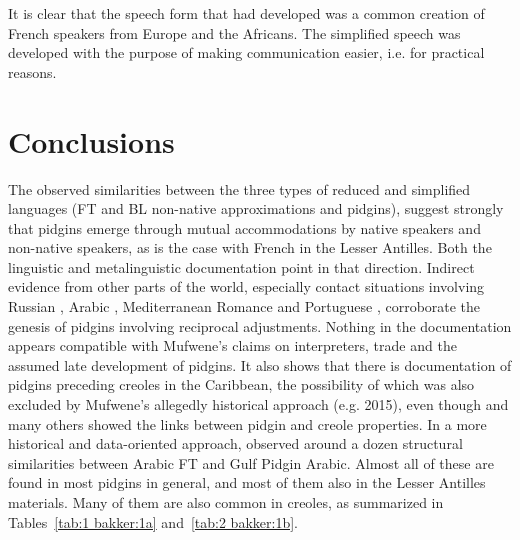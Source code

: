 \documentclass[output=paper,colorlinks,citecolor=brown]{langscibook}
\begin{document}
It is clear that the speech form that had developed was a common creation of French speakers from Europe and the Africans. The simplified speech was developed with the purpose of making communication easier, i.e. for practical reasons.
 
\section{Conclusions}
The observed similarities between the three types of reduced and simplified languages (FT and BL non-native approximations and pidgins), suggest strongly that pidgins emerge through mutual accommodations by native speakers and non-native speakers, as is the case with French in the Lesser Antilles. Both the linguistic and metalinguistic documentation point in that direction. Indirect evidence from other parts of the world, especially contact situations involving Russian \citep{Fedorova2006}, Arabic \citep{Avram2018}, Mediterranean Romance \citep{Schuchardt1909} and Portuguese \citep{Clements1992}, corroborate the genesis of pidgins involving reciprocal adjustments. Nothing in the documentation appears compatible with Mufwene’s claims on interpreters, trade and the assumed late development of pidgins. It also shows that there is documentation of pidgins preceding creoles in the Caribbean, the possibility of which was also excluded by Mufwene's allegedly historical approach (e.g. 2015), even though \citet{Baker2001} and many others showed the links between pidgin and creole properties.
In a more historical and data-oriented approach, \citet{Avram2017} observed around a dozen structural similarities between Arabic FT and Gulf Pidgin Arabic. Almost all of these are found in most pidgins in general, and most of them also in the Lesser Antilles materials. Many of them are also common in creoles, as summarized in Tables~\ref{tab:1 bakker:1a} and~\ref{tab:2 bakker:1b}.
\end{document}
